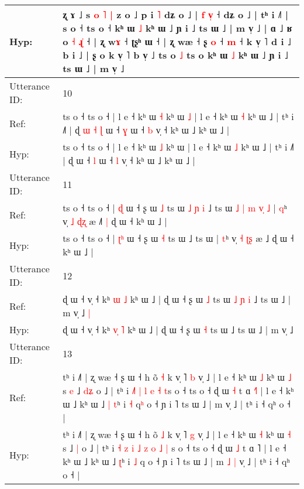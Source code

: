 \documentclass[10pt]{article}
\DeclareRobustCommand{\hl}[1]{{\textcolor{red}{#1}}}
\begin{document}
\begin{longtable}{ll}
 \\
Hyp: & ʐ ɤ ˩ s\hl{ }\hl{o} \hl{˥} \hl{|} z o ˩ p i \hl{˥} dʑ o ˩ | \hl{f} \hl{v}\hl{̩} ˧ dʑ o ˩ | tʰ i ˩˥ | \hl{}s o ˧ ts o ˧ kʰ ɯ \hl{˩} kʰ ɯ ˩ ɲ i ˩ ts ɯ ˩ | m v̩ ˩ | ɑ ˩ ʁ o\hl{ }\hl{˧}\hl{ }\hl{ɻ}\hl{̍} ˧ | ʐ w\hl{ɤ} ˧ ʈʂʰ ɯ ˧ | ʐ wæ ˧\hl{}\hl{} ʂ \hl{o} ˧\hl{}\hl{} \hl{}\hl{m} ˧ k v̩ ˥ d i ˩ b\hl{}\hl{}\hl{}\hl{}\hl{}\hl{} i ˩ | ʂ\hl{}\hl{}\hl{}\hl{}\hl{}\hl{} o\hl{}\hl{}\hl{} k v̩ ˥ b v̩ ˩\hl{}\hl{} ts o \hl{˩} ts o\hl{}\hl{} kʰ ɯ \hl{˩} kʰ ɯ ˩ ɲ i ˩ ts ɯ ˩ | m v̩ ˩\hl{}\hl{}
 \\
\midrule
Utterance ID: & 10 \\
Ref: & ts o ˧ ts o ˧ | l e ˧ kʰ ɯ \hl{˧} kʰ ɯ\hl{ }\hl{˩} | l e ˧ kʰ ɯ \hl{˧} kʰ ɯ ˩ | tʰ i ˩˥ | ɖ\hl{ }\hl{ɯ}\hl{ }\hl{˧}\hl{ }\hl{ɭ} ɯ ˧ \hl{ɣ} ɯ ˧ \hl{b} v̩ ˧ kʰ ɯ ˩ kʰ ɯ ˩ |
 \\
Hyp: & ts o ˧ ts o ˧ | l e ˧ kʰ ɯ \hl{˩} kʰ ɯ\hl{}\hl{} | l e ˧ kʰ ɯ \hl{˩} kʰ ɯ ˩ | tʰ i ˩˥ | ɖ\hl{}\hl{}\hl{}\hl{}\hl{}\hl{} ɯ ˧ \hl{l} ɯ ˧ \hl{l} v̩ ˧ kʰ ɯ ˩ kʰ ɯ ˩ |
 \\
\midrule
Utterance ID: & 11 \\
Ref: & ts o ˧ ts o ˧ | \hl{}\hl{ɖ} ɯ ˧ ʂ ɯ \hl{˩} ts ɯ\hl{ }\hl{˩}\hl{ }\hl{ɲ}\hl{ }\hl{i} ˩ ts ɯ\hl{ }\hl{˩}\hl{ }\hl{|}\hl{ }\hl{m}\hl{ }\hl{v}\hl{̩}\hl{ }\hl{˩} | \hl{q}ʰ v̩ \hl{˩} \hl{ɖ}\hl{ʐ} æ ˩\hl{˥}\hl{ }\hl{|} ɖ ɯ ˧ kʰ ɯ ˩ |
 \\
Hyp: & ts o ˧ ts o ˧ | \hl{ʈ}\hl{ʰ} ɯ ˧ ʂ ɯ \hl{˧} ts ɯ\hl{}\hl{}\hl{}\hl{}\hl{}\hl{} ˩ ts ɯ\hl{}\hl{}\hl{}\hl{}\hl{}\hl{}\hl{}\hl{}\hl{}\hl{}\hl{} | \hl{t}ʰ v̩ \hl{˧} \hl{ʈ}\hl{ʂ} æ ˩\hl{}\hl{}\hl{} ɖ ɯ ˧ kʰ ɯ ˩ |
 \\
\midrule
Utterance ID: & 12 \\
Ref: & ɖ ɯ ˧ v̩ ˧ kʰ \hl{}\hl{ɯ} \hl{˩} kʰ ɯ ˩ | ɖ ɯ ˧ ʂ ɯ \hl{˩} ts ɯ\hl{ }\hl{˩}\hl{ }\hl{ɲ}\hl{ }\hl{i} ˩ ts ɯ ˩ | m v̩ ˩\hl{ }\hl{|}
 \\
Hyp: & ɖ ɯ ˧ v̩ ˧ kʰ \hl{v}\hl{̩} \hl{˥} kʰ ɯ ˩ | ɖ ɯ ˧ ʂ ɯ \hl{˧} ts ɯ\hl{}\hl{}\hl{}\hl{}\hl{}\hl{} ˩ ts ɯ ˩ | m v̩ ˩\hl{}\hl{}
 \\
\midrule
Utterance ID: & 13 \\
Ref: & tʰ i ˩˥ | ʐ wæ ˧ ʂ ɯ ˧ h õ \hl{˧} k v̩ ˥ \hl{b} v̩ ˩ | l e ˧ kʰ ɯ \hl{˩} kʰ ɯ \hl{˩} s\hl{ }\hl{e} ˩ \hl{d}\hl{ʑ} o ˩ | tʰ i\hl{}\hl{} \hl{}\hl{˩}\hl{˥} \hl{|} \hl{l} \hl{e} \hl{˧} \hl{}\hl{t}s o ˧ ts o ˧ ɖ ɯ \hl{˧} t ɑ \hl{˧}˥ | l e ˧ kʰ ɯ ˩ kʰ ɯ ˩\hl{ }\hl{|} \hl{t}ʰ i \hl{˧} q\hl{ʰ} o ˧ ɲ i ˥ ts ɯ ˩ | m\hl{}\hl{}\hl{}\hl{} v̩ ˩ | tʰ i ˧ qʰ o ˧ |
 \\
Hyp: & tʰ i ˩˥ | ʐ wæ ˧ ʂ ɯ ˧ h õ \hl{˩} k v̩ ˥ \hl{g} v̩ ˩ | l e ˧ kʰ ɯ \hl{˧} kʰ ɯ \hl{˧} s\hl{}\hl{} ˩ \hl{}\hl{|} o ˩ | tʰ i\hl{ }\hl{˧} \hl{z}\hl{ }\hl{i} \hl{˩} \hl{z} \hl{o} \hl{˩} \hl{|}\hl{ }s o ˧ ts o ˧ ɖ ɯ \hl{˩} t ɑ \hl{}˥ | l e ˧ kʰ ɯ ˩ kʰ ɯ ˩\hl{}\hl{} \hl{ʈ}ʰ i \hl{˩} q\hl{} o ˧ ɲ i ˥ ts ɯ ˩ | m\hl{ }\hl{˩}\hl{ }\hl{|} v̩ ˩ | tʰ i ˧ qʰ o ˧ |

\end{longtable}
\end{document}

